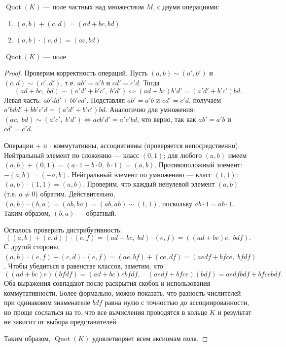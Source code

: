 \begin{definition}
    \(\operatorname{Quot}(K)\) --- поле частных над множеством \(M\), с двумя операциями:
    \begin{enumerate}
        \item \((a, b) + (c, d) = (ad + bc, bd)\)
        \item \((a, b) \cdot (c, d) = (ac, bd)\)
    \end{enumerate}
\end{definition}

\begin{theorem}
    \(\operatorname{Quot}(K)\) --- поле
\end{theorem}
\begin{proof}
    Проверим корректность операций. Пусть \((a,b) \sim (a',b')\) и \((c,d) \sim (c',d')\), т.е. \(ab' = a'b\) и \(cd' = c'd\). Тогда
    \[
    (ad+bc,\;bd) \sim (a'd'+b'c',\;b'd') \Longleftrightarrow (ad+bc)b'd' = (a'd'+b'c')bd.
    \]
    Левая часть: \(ab'dd' + bb'cd'\). Подставляя \(ab' = a'b\) и \(cd' = c'd\), получаем \(a'bdd' + bb'c'd = (a'd' + b'c')bd\). Аналогично для умножения:
    \((ac,\;bd) \sim (a'c',\;b'd') \Longleftrightarrow acb'd' = a'c'bd\), что верно, так как \(ab' = a'b\) и \(cd' = c'd\).

    Операции \(+\) и \(\cdot\) коммутативны, ассоциативны (проверяется непосредственно). Нейтральный элемент по сложению — класс \((0,1)\); для любого \((a,b)\) имеем \((a,b)+(0,1) = (a\cdot1+b\cdot0,\;b\cdot1) = (a,b)\). Противоположный элемент: \(-(a,b) = (-a,b)\). Нейтральный элемент по умножению — класс \((1,1)\): \((a,b)\cdot(1,1) = (a,b)\). Проверим, что каждый ненулевой элемент \((a,b)\) (т.е. \(a \neq 0\)) обратим. Действительно, \((a,b)\cdot(b,a) = (ab,ba) = (ab,ab) \sim (1,1)\), поскольку \(ab\cdot1 = ab\cdot1\). Таким образом, \((b,a)\) — обратный.

    Осталось проверить дистрибутивность:
    \[
    ((a,b)+(c,d))\cdot(e,f) = (ad+bc,\;bd)\cdot(e,f) = ((ad+bc)e,\;bdf).
    \]
    С другой стороны, \((a,b)\cdot(e,f)+(c,d)\cdot(e,f) = (ae,bf)+(ce,df) = (aedf + bfce,\;bfdf)\). Чтобы убедиться в равенстве классов, заметим, что
    \[
    ((ad+bc)e)(bfdf) = (ad+bc)ebfdf,\quad (aedf + bfce)(bdf) = aedfbdf + bfcebdf.
    \]
    Оба выражения совпадают после раскрытия скобок и использования коммутативности. Более формально, можно показать, что разность числителей при одинаковом знаменателе \(bdf\) равна нулю с точностью до ассоциированности, но проще сослаться на то, что все вычисления проводятся в кольце \(K\) и результат не зависит от выбора представителей.

    Таким образом, \(\operatorname{Quot}(K)\) удовлетворяет всем аксиомам поля.
\end{proof}


